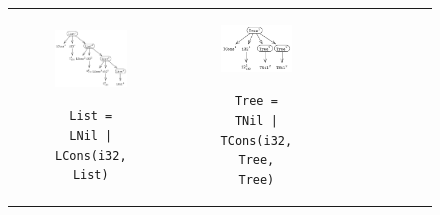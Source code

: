 \begin{figure}[t]
\begin{tabular}{ccc}
\begin{subfigure}[b]{0.32\textwidth}
\begin{center}
{\includegraphics[scale=0.8]{chapters/figures/figParseTreeList3.pdf}}
\end{center}
\caption{\label{fig:listParseTree}{\small\tt List = LNil | \newline LCons(i32, List)}}
\end{subfigure}%
&
\begin{subfigure}[b]{0.22\textwidth}
\begin{center}
{\includegraphics[scale=0.78]{chapters/figures/figParseTreeTree2.pdf}}
\vspace{10px}
\end{center}
\caption{\label{fig:treeParseTree}{\footnotesize\tt Tree = TNil | \newline TCons(i32, Tree, Tree)}}
\end{subfigure}%
&
\begin{subfigure}[b]{0.4\textwidth}
\begin{center}
{\includegraphics[scale=0.78]{chapters/figures/figParseTreeMatrix2.pdf}}

\end{center}
\end{subfigure}
\end{tabular}
\end{figure}
